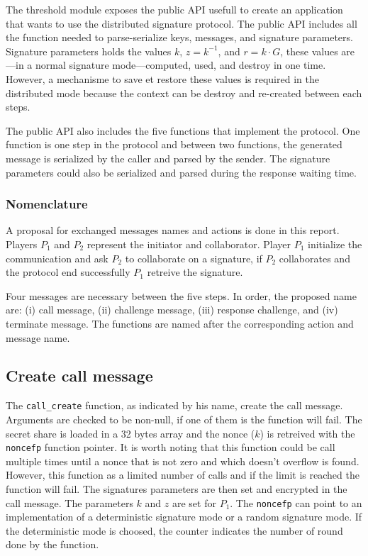 The threshold module exposes the public API usefull to create an application that
wants to use the distributed signature protocol. The public API includes all the
function needed to parse-serialize keys, messages, and signature parameters.
Signature parameters holds the values $k$, $z = k^{-1}$, and $r = k \cdot G$, these
values are---in a normal signature mode---computed, used, and destroy in one time.
However, a mechanisme to save et restore these values is required in the distributed mode
because the context can be destroy and re-created between each steps.

The public API also includes the five functions that implement the protocol.
One function is one step in the protocol and between two functions, the generated
message is serialized by the caller and parsed by the sender. The signature parameters
could also be serialized and parsed during the response waiting time.

\subsubsection{Nomenclature}

A proposal for exchanged messages names and actions is done in this report.
Players $P_1$ and $P_2$ represent the initiator and collaborator. Player $P_1$
initialize the communication and ask $P_2$ to collaborate on a signature, if
$P_2$ collaborates and the protocol end successfully $P_1$ retreive the signature.

Four messages are necessary between the five steps. In order, the proposed name are:
(i) call message, (ii) challenge message, (iii) response challenge, and (iv) terminate
message. The functions are named after the corresponding action and message name.

\subsection{Create call message}

The \texttt{call\_create} function, as indicated by his name, create the call message.
Arguments are checked to be non-null, if one of them is the function will fail.
The secret share is loaded in a 32 bytes array and the nonce ($k$) is retreived
with the \texttt{noncefp} function pointer. It is worth noting that this function could
be call multiple times until a nonce that is not zero and which doesn't overflow is found.
However, this function as a limited number of calls and if the limit is reached the
function will fail. The signatures parameters are then set and encrypted in the
call message. The parameters $k$ and $z$ are set for $P_1$. The \texttt{noncefp}
can point to an implementation of a deterministic signature mode or a random %
signature mode. If the deterministic mode is choosed, the counter indicates the
number of round done by the function.

